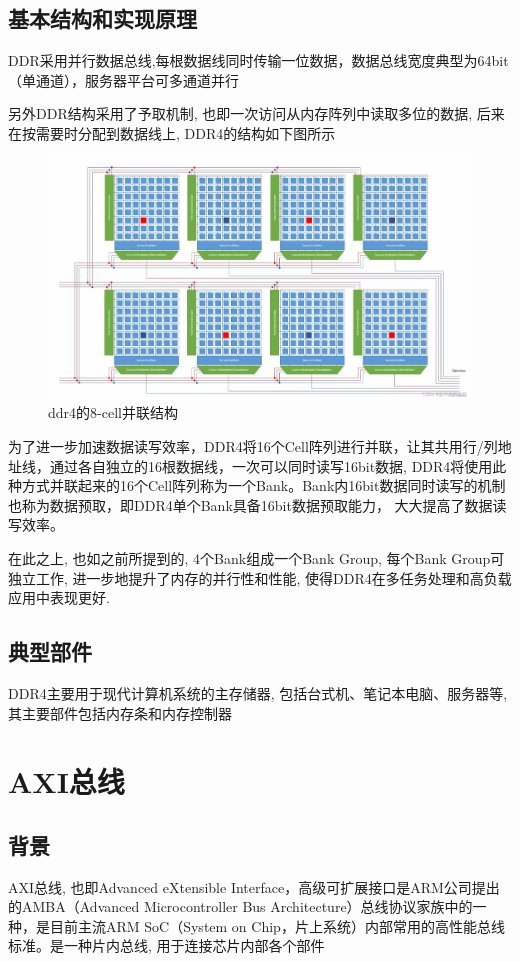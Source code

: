 \documentclass[14pt]{article}
\begin{document}
\subsection{基本结构和实现原理}
DDR采用并行数据总线,每根数据线同时传输一位数据，数据总线宽度典型为64bit（单通道），服务器平台可多通道并行\par
另外DDR结构采用了予取机制, 也即一次访问从内存阵列中读取多位的数据, 后来在按需要时分配到数据线上, DDR4的结构如下图所示
\begin{figure}[H]
    \centering
    \includegraphics[width=1\textwidth]{drr4.jpg}
    \caption{ddr4的8-cell并联结构}
\end{figure}
为了进一步加速数据读写效率，DDR4将16个Cell阵列进行并联，让其共用行/列地址线，通过各自独立的16根数据线，一次可以同时读写16bit数据,
DDR4将使用此种方式并联起来的16个Cell阵列称为一个Bank。Bank内16bit数据同时读写的机制也称为数据预取，即DDR4单个Bank具备16bit数据预取能力，
大大提高了数据读写效率。\par
在此之上, 也如之前所提到的, 4个Bank组成一个Bank Group, 每个Bank Group可独立工作, 进一步地提升了内存的并行性和性能, 使得DDR4在多任务处理和高负载应用中表现更好.\par
\subsection{典型部件}
DDR4主要用于现代计算机系统的主存储器, 包括台式机、笔记本电脑、服务器等, 其主要部件包括内存条和内存控制器

\bigskip
\bigskip
\bigskip
\bigskip
\bigskip


\section{AXI总线}
\subsection{背景}
AXI总线, 也即Advanced eXtensible Interface，高级可扩展接口是ARM公司提出的AMBA（Advanced Microcontroller Bus Architecture）总线协议家族中的一种，是目前主流ARM 
SoC（System on Chip，片上系统）内部常用的高性能总线标准。是一种片内总线, 用于连接芯片内部各个部件
\end{document}
